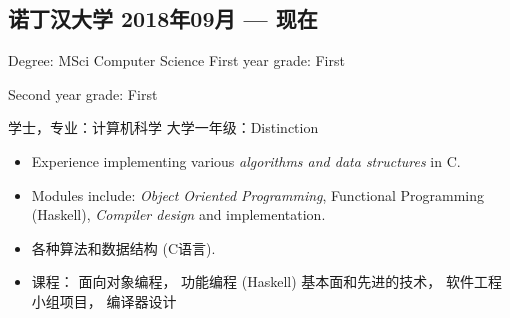 \begin{xcn}
        \subsection{诺丁汉大学
        \hfill 2018年09月 --- 现在}
\end{xcn}
\begin{xen}
        Degree: MSci Computer Science
        \hfill
        First year grade: First\\
        {\raggedleft Second year grade: First\par}
\end{xen}
\begin{xcn}
        学士，专业：计算机科学
        \hfill
        大学一年级：Distinction\\
        {}
\end{xcn}
\begin{xen}
        \begin{itemize}
            \item Experience implementing various \emph{algorithms and data
                structures} in C.
            \item Modules include: \emph{Object Oriented Programming},
                Functional Programming (Haskell), \emph{Compiler design} and
                implementation.
        \end{itemize}
\end{xen}
\begin{xcn} %
        \begin{itemize}
            \item 各种算法和数据结构 (C语言).
            \item 课程：
面向对象编程，
功能编程 (Haskell) \textendash{} 基本面和先进的技术，
软件工程小组项目，
编译器设计
        \end{itemize}
\end{xcn}
